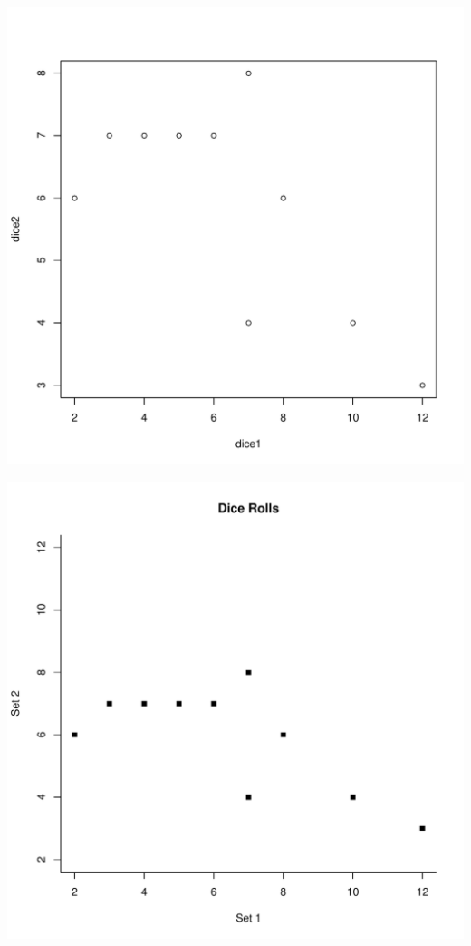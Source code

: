 \documentclass[12pt]{article}\usepackage[]{graphicx}\usepackage[]{color}
\makeatletter
\def\maxwidth{ %
  \ifdim\Gin@nat@width>\linewidth
    \linewidth
  \else
    \Gin@nat@width
  \fi
}
\newenvironment{knitrout}{}{} %
\makeatother
\begin{document}
\begin{minipage}[b]{0.5\linewidth}
\begin{knitrout}
\color{fgcolor}
\includegraphics[width=\maxwidth]{figure/plot2a} 

\end{knitrout}

\end{minipage}
\begin{minipage}[b]{0.5\linewidth}
\begin{knitrout}
\color{fgcolor}
\includegraphics[width=\maxwidth]{figure/plot2b} 

\end{knitrout}

\end{minipage}
\end{document}
